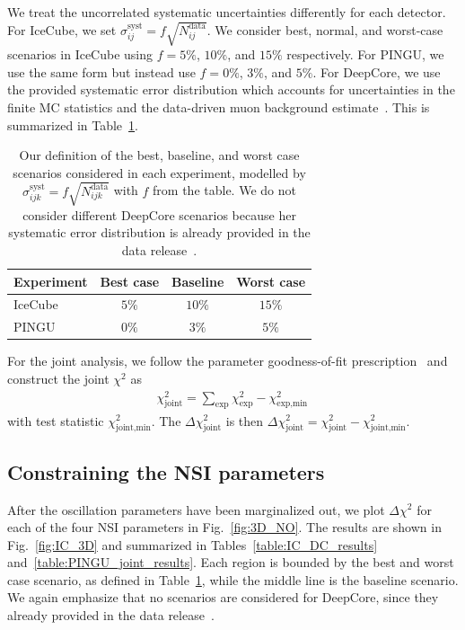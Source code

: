 We treat the uncorrelated systematic uncertainties differently for each detector. For IceCube, we set $\sigma_{ij}^\text{syst} = f\sqrt{N_{ij}^\text{data}}$.
We consider best, normal, and worst-case scenarios in IceCube using
$f=5\%$, $10\%$, and $15\%$ respectively. For PINGU, we use the same form but instead use $f=0\%$, $3\%$, and $5\%$.
For DeepCore, we use the provided systematic error distribution which accounts for uncertainties in the finite MC statistics and the data-driven 
muon background estimate~\cite{DC2019data}. This is summarized in Table~\ref{table:syst_errors}.
{\renewcommand{\arraystretch}{1.2}
\begin{table}
   \centering
   \begin{tabular}{lccc}
      \hline \hline
      Experiment & Best case & Baseline & Worst case \\
      \hline
      IceCube & $5\%$ & $10\%$ & $15\%$ \\
      PINGU & $0\%$ & $3\%$ & $5\%$ \\
      \hline \hline
   \end{tabular}
   \caption{Our definition of the best, baseline, and worst case scenarios considered in each experiment, modelled by $\sigma_{ijk}^\text{syst} = f\sqrt{N_{ijk}^\text{data}}$ with $f$ from the table.
   We do not consider different DeepCore scenarios because her systematic error distribution is already provided in the data release~\cite{DC2019data}.}\label{table:syst_errors}
\end{table}

For the joint analysis, we follow the parameter goodness-of-fit prescription~\cite{maltoni2003} and construct the joint $\chi^2$ as 
\begin{align}\label{eq:joint_chisq}
    \chi^2_\text{joint} = \sum_\text{exp}\chi^2_\text{exp} - \chi^2_\text{exp,min}\,
\end{align}
with test statistic $\chi^2_\text{joint,min}$. The $\Delta \chi^2_\text{joint}$ is then $\Delta \chi^2_\text{joint} = \chi^2_\text{joint} - \chi^2_\text{joint,min}$.

\subsection{Constraining the NSI parameters}\label{sec:constraining_NSI}
After the oscillation parameters have been marginalized out, we plot $\Delta \chi^2$ for each of the four NSI parameters in Fig.~\ref{fig:3D_NO}. 
The results are shown in Fig.~\ref{fig:IC_3D} and summarized in Tables~\ref{table:IC_DC_results} and~\ref{table:PINGU_joint_results}. Each region is bounded
by the best and worst case scenario, as defined in Table~\ref{table:syst_errors}, while the middle line is the baseline scenario. We again emphasize that 
no scenarios are considered for DeepCore, since they already provided in the data release~\cite{DC2019data}.

}
